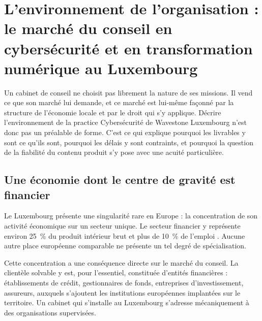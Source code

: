 
\section{L'environnement de l'organisation : le marché du conseil en cybersécurité et en transformation numérique au Luxembourg}

Un cabinet de conseil ne choisit pas librement la nature de ses missions. Il vend ce que
son marché lui demande, et ce marché est lui-même façonné par la structure de l'économie
locale et par le droit qui s'y applique. Décrire l'environnement de la practice
Cybersécurité de Wavestone Luxembourg n'est donc pas un préalable de forme. C'est ce qui
explique pourquoi les livrables y sont ce qu'ils sont, pourquoi les délais y sont
contraints, et pourquoi la question de la fiabilité du contenu produit s'y pose avec une
acuité particulière.

\subsection{Une économie dont le centre de gravité est financier}

Le Luxembourg présente une singularité rare en Europe : la concentration de son activité
économique sur un secteur unique. Le secteur financier y représente environ 25~\% du
produit intérieur brut et plus de 10~\% de l'emploi \cite{tresor2026luxembourg}.
Aucune autre place européenne comparable ne présente un tel degré de spécialisation.

Cette concentration a une conséquence directe sur le marché du conseil. La clientèle
solvable y est, pour l'essentiel, constituée d'entités financières : établissements de
crédit, gestionnaires de fonds, entreprises d'investissement, assureurs, auxquels
s'ajoutent les institutions européennes implantées sur le territoire. Un cabinet qui
s'installe au Luxembourg s'adresse mécaniquement à des organisations supervisées.

